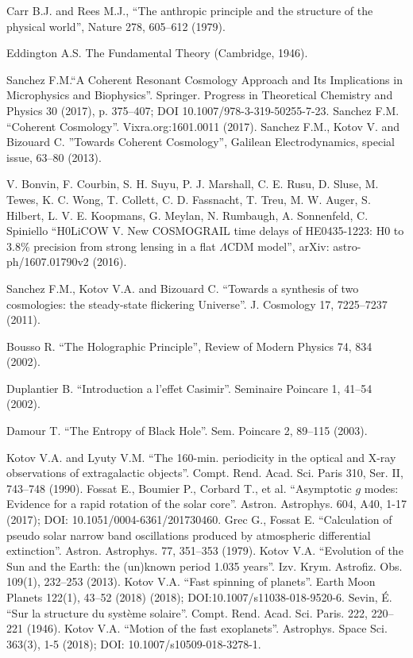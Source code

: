 \documentclass[twoside,draft]{article}
\begin{document}
\begin{sloppypar}
\begin{thebibliography}{99}\footnotesize

 Carr B.J. and Rees M.J., ``The anthropic principle and the
structure of the physical world'', Nature 278, 605--612 (1979).

 Eddington A.S. The Fundamental Theory (Cambridge, 1946).

 Sanchez F.M.``A Coherent Resonant Cosmology Approach and Its Implications in Microphysics and Biophysics''. Springer. Progress in Theoretical Chemistry and Physics 30 (2017), p. 375--407; DOI 10.1007/978-3-319-50255-7-23.  Sanchez F.M. ``Coherent Cosmology''. Vixra.org:1601.0011 (2017). Sanchez F.M., Kotov V. and Bizouard C. ''Towards Coherent Cosmology'', Galilean Electrodynamics, special issue, 63--80 (2013).

 V. Bonvin, F. Courbin, S. H. Suyu, P. J. Marshall, C. E. Rusu, D. Sluse, M. Tewes, K. C. Wong, T. Collett, C. D. Fassnacht, T. Treu, M. W. Auger, S. Hilbert, L. V. E. Koopmans, G. Meylan, N. Rumbaugh, A. Sonnenfeld, C. Spiniello ``H0LiCOW V. New COSMOGRAIL time delays of HE0435-1223: H0 to 3.8\% precision from strong lensing in a flat $\Lambda$CDM model'', arXiv: astro-ph/1607.01790v2 (2016).

 Sanchez F.M., Kotov V.A. and Bizouard C. ``Towards a synthesis of
two cosmologies: the steady-state flickering Universe''. J. Cosmology 17,
7225--7237 (2011).

 Bousso R. ``The Holographic Principle'', Review of Modern Physics
74, 834 (2002).

 Duplantier B. ``Introduction a l'effet Casimir''. Seminaire
Poincare 1, 41--54 (2002).

 Damour T. ``The Entropy of Black Hole''. Sem. Poincare 2, 89--115 (2003).

 Kotov V.A. and Lyuty V.M. ``The 160-min. periodicity in the optical
and X-ray observations of extragalactic objects''. Compt. Rend. Acad. Sci.
Paris 310, Ser. II, 743--748 (1990). Fossat E., Boumier P., Corbard T., et al.
``Asymptotic $g$ modes: Evidence for a rapid rotation of the solar core''.
Astron. Astrophys. 604, A40, 1-17 (2017); DOI: 10.1051/0004-6361/201730460.
Grec G., Fossat E. ``Calculation of pseudo solar narrow band oscillations
produced by atmospheric differential extinction''. Astron. Astrophys. 77,
351--353 (1979). Kotov V.A. ``Evolution of the Sun and the Earth: the (un)known
period 1.035 years''. Izv. Krym. Astrofiz. Obs. 109(1), 232--253 (2013).
Kotov V.A. ``Fast spinning of planets''. Earth Moon Planets 122(1), 43--52
(2018) (2018); DOI:10.1007/s11038-018-9520-6. Sevin, \'E. ``Sur la structure du
syst\`eme solaire''. Compt. Rend. Acad. Sci. Paris. 222, 220--221 (1946).
Kotov V.A. ``Motion of the fast exoplanets''. Astrophys. Space Sci. 363(3), 1-5
(2018); DOI: 10.1007/s10509-018-3278-1.


\end{thebibliography}
\end{sloppypar}
\end{document}
